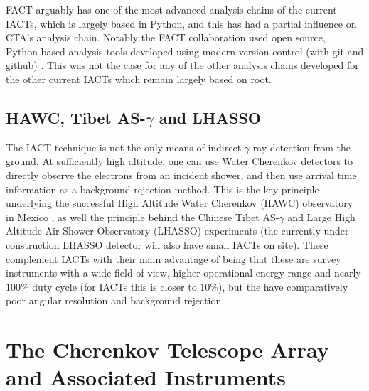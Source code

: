 FACT arguably has one of the most advanced analysis chains of the current IACTs, which is largely based in Python, and this has had a partial influence on CTA's analysis chain. Notably the FACT collaboration used open source, Python-based analysis tools developed using modern version control (with git and github) \cite{factspec}. This was not the case for any of the other analysis chains developed for the other current IACTs which remain largely based on root.

\subsection{HAWC, Tibet AS-\ensuremath{\gamma} and LHASSO}

The IACT technique is not the only means of indirect $\gamma$-ray detection from the ground. At sufficiently high altitude, one can use Water Cherenkov detectors to directly observe the electrons from an incident shower, and then use arrival time information as a background rejection method. This is the key principle underlying the successful High Altitude Water Cherenkov (HAWC) observatory in Mexico \cite{hawc}, as well the principle behind the Chinese Tibet AS-$\gamma$ \cite{asgamma} and Large High Altitude Air Shower Observatory (LHASSO) \cite{lhassocrab} experiments (the currently under construction LHASSO detector will also have small IACTs on site). These complement IACTs with their main advantage of being that these are survey instruments with a wide field of view, higher operational energy range and nearly $100\%$ duty cycle (for IACTs this is closer to $10\%$), but the have comparatively poor angular resolution and background rejection. 

\section{The Cherenkov Telescope Array and Associated Instruments}
